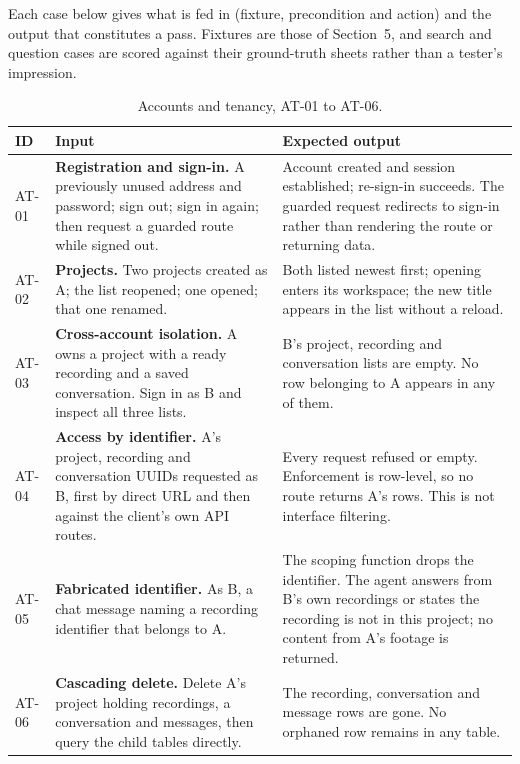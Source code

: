 \documentclass[11pt,a4paper]{article}
\begin{document}
Each case below gives what is fed in (fixture, precondition and action) and the
output that constitutes a pass. Fixtures are those of Section~5, and search and question
cases are scored against their ground-truth sheets rather than a tester's impression.

\begin{table}[htbp]
\centering
\scriptsize
\begin{tabularx}{\textwidth}{@{}L{0.85cm}XX@{}}
\toprule
\textbf{ID} & \textbf{Input} & \textbf{Expected output} \\
\midrule
AT-01 & \textbf{Registration and sign-in.} A previously unused address and password;
sign out; sign in again; then request a guarded route while signed out. &
Account created and session established; re-sign-in succeeds. The guarded request
redirects to sign-in rather than rendering the route or returning data. \\
AT-02 & \textbf{Projects.} Two projects created as A; the list reopened; one opened; that
one renamed. &
Both listed newest first; opening enters its workspace; the new title appears in the list
without a reload. \\
AT-03 & \textbf{Cross-account isolation.} A owns a project with a ready recording and a
saved conversation. Sign in as B and inspect all three lists. &
B's project, recording and conversation lists are empty. No row belonging to A appears in
any of them. \\
AT-04 & \textbf{Access by identifier.} A's project, recording and conversation UUIDs
requested as B, first by direct URL and then against the client's own API routes. &
Every request refused or empty. Enforcement is row-level, so no route returns A's rows.
This is not interface filtering. \\
AT-05 & \textbf{Fabricated identifier.} As B, a chat message naming a recording identifier
that belongs to A. &
The scoping function drops the identifier. The agent answers from B's own recordings or
states the recording is not in this project; no content from A's footage is returned. \\
AT-06 & \textbf{Cascading delete.} Delete A's project holding recordings, a conversation
and messages, then query the child tables directly. &
The recording, conversation and message rows are gone. No orphaned row remains in any
table. \\
\bottomrule
\end{tabularx}
\caption{Accounts and tenancy, AT-01 to AT-06.}
\end{table}
\end{document}
